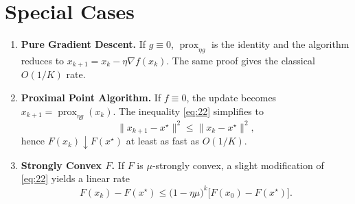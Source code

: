 \documentclass{article}
\newcommand{\prox}{\operatorname{prox}}
\begin{document}
\section*{Special Cases}
\begin{enumerate}[label=(\alph*)]
\item \textbf{Pure Gradient Descent.}  If $g\equiv0$, $\prox_{\eta g}$ is the identity and the algorithm reduces to $x_{k+1}=x_{k}-\eta\nabla f(x_{k})$.  The same proof gives the classical $O(1/K)$ rate.
\item \textbf{Proximal Point Algorithm.}  If $f\equiv0$, the update becomes $x_{k+1}= \prox_{\eta g}(x_{k})$.  The inequality \eqref{eq:22} simplifies to
\[
\|x_{k+1}-x^{\star}\|^{2}\le\|x_{k}-x^{\star}\|^{2},
\]
hence $F(x_{k})\downarrow F(x^{\star})$ at least as fast as $O(1/K)$.
\item \textbf{Strongly Convex $F$.}  If $F$ is $\mu$‑strongly convex, a slight modification of \eqref{eq:22} yields a linear rate
\[
F(x_{k})-F(x^{\star})\le\bigl(1-\eta\mu\bigr)^{k}\bigl[F(x_{0})-F(x^{\star})\bigr].
\]
\end{enumerate}
\end{document}
